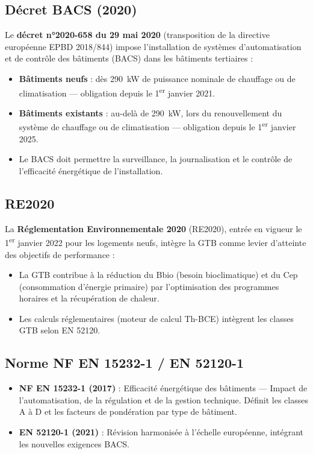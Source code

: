 \subsection{Décret BACS (2020)}

Le \textbf{décret n°2020-658 du 29 mai 2020} (transposition de la directive européenne EPBD 2018/844) impose l'installation de systèmes d'automatisation et de contrôle des bâtiments (BACS) dans les bâtiments tertiaires :

\begin{itemize}
  \item \textbf{Bâtiments neufs} : dès \SI{290}{\kilo\watt} de puissance nominale de chauffage ou de climatisation — obligation depuis le 1\textsuperscript{er} janvier 2021.
  \item \textbf{Bâtiments existants} : au-delà de \SI{290}{\kilo\watt}, lors du renouvellement du système de chauffage ou de climatisation — obligation depuis le 1\textsuperscript{er} janvier 2025.
  \item Le BACS doit permettre la surveillance, la journalisation et le contrôle de l'efficacité énergétique de l'installation.
\end{itemize}

\subsection{RE2020}

La \textbf{Réglementation Environnementale 2020} (RE2020), entrée en vigueur le 1\textsuperscript{er} janvier 2022 pour les logements neufs, intègre la GTB comme levier d'atteinte des objectifs de performance :
\begin{itemize}
  \item La GTB contribue à la réduction du Bbio (besoin bioclimatique) et du Cep (consommation d'énergie primaire) par l'optimisation des programmes horaires et la récupération de chaleur.
  \item Les calculs réglementaires (moteur de calcul Th-BCE) intègrent les classes GTB selon EN 52120.
\end{itemize}

\subsection{Norme NF EN 15232-1 / EN 52120-1}

\begin{itemize}
  \item \textbf{NF EN 15232-1 (2017)} : Efficacité énergétique des bâtiments — Impact de l'automatisation, de la régulation et de la gestion technique. Définit les classes A à D et les facteurs de pondération par type de bâtiment.
  \item \textbf{EN 52120-1 (2021)} : Révision harmonisée à l'échelle européenne, intégrant les nouvelles exigences BACS.
\end{itemize}


